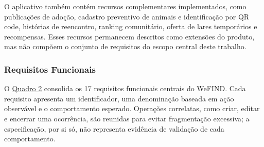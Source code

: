 O aplicativo também contém recursos complementares implementados, como publicações de adoção, cadastro preventivo de animais e identificação por QR code, histórias de reencontro, ranking comunitário, oferta de lares temporários e recompensas. Esses recursos permanecem descritos como extensões do produto, mas não compõem o conjunto de requisitos do escopo central deste trabalho.


\subsubsection{Requisitos Funcionais}

O \hyperref[quadro:funcionais]{Quadro 2} consolida os 17 requisitos funcionais centrais do WeFIND. Cada requisito apresenta um identificador, uma denominação baseada em ação observável e o comportamento esperado. Operações correlatas, como criar, editar e encerrar uma ocorrência, são reunidas para evitar fragmentação excessiva; a especificação, por si só, não representa evidência de validação de cada comportamento.

